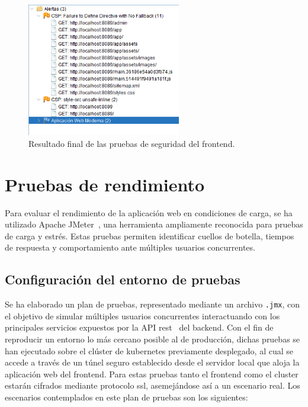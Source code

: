 \begin{figure}[h!tb]
    \centering
    \includegraphics[width=0.6\textwidth]{figs/alertas_post_front.png}
    \caption{Resultado final de las pruebas de seguridad del frontend.\label{fig:pruebas-seguridad-frontend-final}}
\end{figure}

\section{Pruebas de rendimiento}
Para evaluar el rendimiento de la aplicación web en condiciones de carga, se ha utilizado Apache JMeter~\cite{jmeter:web}, una herramienta ampliamente reconocida para pruebas de carga y estrés. Estas pruebas permiten identificar cuellos de botella, tiempos de respuesta y comportamiento ante múltiples usuarios concurrentes.

\subsection{Configuración del entorno de pruebas}
Se ha elaborado un plan de pruebas, representado mediante un archivo \texttt{.jmx}, con el objetivo de simular múltiples usuarios concurrentes interactuando con los principales servicios expuestos por la \gls{API} \gls{rest}~\cite{kotstein2021restdelphi} del \gls{backend}. Con el fin de reproducir un entorno lo más cercano posible al de producción, dichas pruebas se han ejecutado sobre el clúster de \gls{kubernetes} previamente desplegado, al cual se accede a través de un túnel seguro establecido desde el servidor local que aloja la aplicación web del \gls{frontend}. Para estas pruebas tanto el \gls{frontend} como el cluster estarán cifrados mediante protocolo \gls{ssl}, asemejándose así a un escenario real. Los escenarios contemplados en este plan de pruebas son los siguientes:


